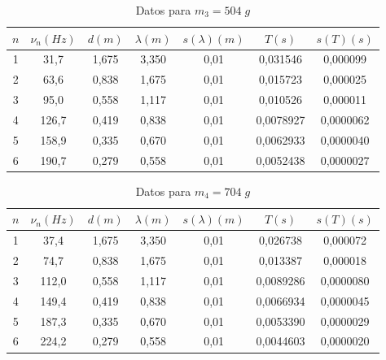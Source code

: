 \documentclass[a4paper,12pt,titlepage]{article}
\begin{document}
\begin{table}[h!]
    \centering
        \begin{tabular}{|c|c|c|c|c|c|c|}
            \hline
            $n$ & $\nu_n(Hz)$ & $d(m)$& $\lambda(m)$ & $s(\lambda)(m)$ &$T(s)$ & $s(T)(s)$ \\ \hline
            1 & 31,7  & 1,675 & 3,350 & 0,01 & 0,031546  & 0,000099  \\ \hline
            2 & 63,6  & 0,838 & 1,675 & 0,01 & 0,015723  & 0,000025  \\ \hline
            3 & 95,0    & 0,558 & 1,117 & 0,01 & 0,010526  & 0,000011  \\ \hline
            4 & 126,7 & 0,419 & 0,838 & 0,01 & 0,0078927 & 0,0000062 \\ \hline
            5 & 158,9 & 0,335 & 0,670 & 0,01 & 0,0062933 & 0,0000040 \\ \hline
            6 & 190,7 & 0,279 & 0,558 & 0,01 & 0,0052438 & 0,0000027 \\ \hline
        \end{tabular}
    \caption{Datos para $m_3=504\;g$}
    \label{masa3}
\end{table}

\begin{table}[h!]
    \centering
        \begin{tabular}{|c|c|c|c|c|c|c|}
            \hline
            $n$ & $\nu_n(Hz)$ & $d(m)$& $\lambda(m)$ & $s(\lambda)(m)$ &$T(s)$ & $s(T)(s)$ \\ \hline
                1 & 37,4  & 1,675 & 3,350 & 0,01 & 0,026738  & 0,000072  \\ \hline
                2 & 74,7  & 0,838 & 1,675 & 0,01 & 0,013387  & 0,000018  \\ \hline
                3 & 112,0   & 0,558 & 1,117 & 0,01 & 0,0089286 & 0,0000080 \\ \hline
                4 & 149,4 & 0,419 & 0,838 & 0,01 & 0,0066934 & 0,0000045 \\ \hline
                5 & 187,3 & 0,335 & 0,670 & 0,01 & 0,0053390 & 0,0000029 \\ \hline
                6 & 224,2 & 0,279 & 0,558 & 0,01 & 0,0044603 & 0,0000020 \\ \hline
            \end{tabular}
            \caption{Datos para $m_4=704\;g$}
            \label{masa4}
\end{table}
\end{document}
